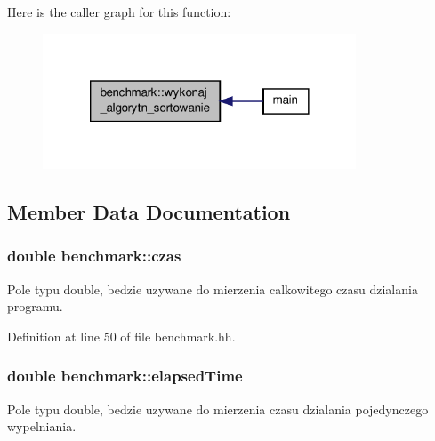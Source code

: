 Here is the caller graph for this function\-:
\nopagebreak
\begin{figure}[H]
\begin{center}
\leavevmode
\includegraphics[width=264pt]{classbenchmark_a845da6947383df74d871e273bf225721_icgraph}
\end{center}
\end{figure}




\subsection{Member Data Documentation}
\hypertarget{classbenchmark_a563b747421276232836b7711b6881ec8}{
\subsubsection[{czas}]{\setlength{\rightskip}{0pt plus 5cm}double benchmark\-::czas\hspace{0.3cm}{\ttfamily [private]}}}\label{classbenchmark_a563b747421276232836b7711b6881ec8}


Pole typu double, bedzie uzywane do mierzenia calkowitego czasu dzialania programu. 



Definition at line 50 of file benchmark.\-hh.

\hypertarget{classbenchmark_a90e6eda0144befd3f3bc1a881904fb57}{
\subsubsection[{elapsed\-Time}]{\setlength{\rightskip}{0pt plus 5cm}double benchmark\-::elapsed\-Time\hspace{0.3cm}{\ttfamily [private]}}}\label{classbenchmark_a90e6eda0144befd3f3bc1a881904fb57}


Pole typu double, bedzie uzywane do mierzenia czasu dzialania pojedynczego wypelniania. 




